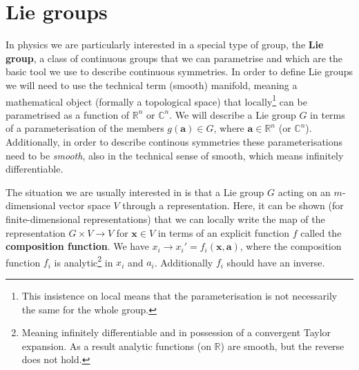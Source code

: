 \documentclass[notes.tex]{subfiles}
\begin{document}


\section{Lie groups}
\label{sec:Lie_groups}
In physics we are particularly interested in a special type of group, the {\bf Lie group}, a class of continuous groups that we can parametrise and which are the basic tool we use to describe continuous symmetries. In order to define Lie groups we will need to use the technical term (smooth) manifold, meaning a mathematical object (formally a topological space) that locally\footnote{This insistence on local means that the parameterisation is not necessarily the same for the whole group.} can be parametrised as a function of  $\mathbb{R}^n$ or $\mathbb{C}^n$. We will describe a Lie group $G$ in terms of a parameterisation of the members $g(\mathbf a)\in G$, where $\mathbf a\in \mathbb{R}^n$ (or $\mathbb{C}^n$). Additionally, in order to describe continous symmetries these parameterisations need to be {\it smooth}, also in the technical sense of smooth, which means infinitely differentiable.


The situation we are usually interested in is that a Lie group $G$ acting on an $m$-dimensional vector space $V$ through a representation. Here, it can be shown (for finite-dimensional representations) that we can locally write the map of the representation $G\times V \to V$ for $\mathbf{x} \in V$ in terms of an explicit function $f$ called the {\bf composition function}. We have $x_i \to x_i' = f_i(\mathbf x, \mathbf a)$, where the composition function $f_i$ is analytic\footnote{Meaning infinitely differentiable and in possession of a  convergent Taylor expansion. As a result analytic functions (on $\mathbb{R}$) are smooth, but the reverse does not hold.} in $x_i$ and $a_i$. Additionally $f_i$ should have an inverse.
\end{document}
